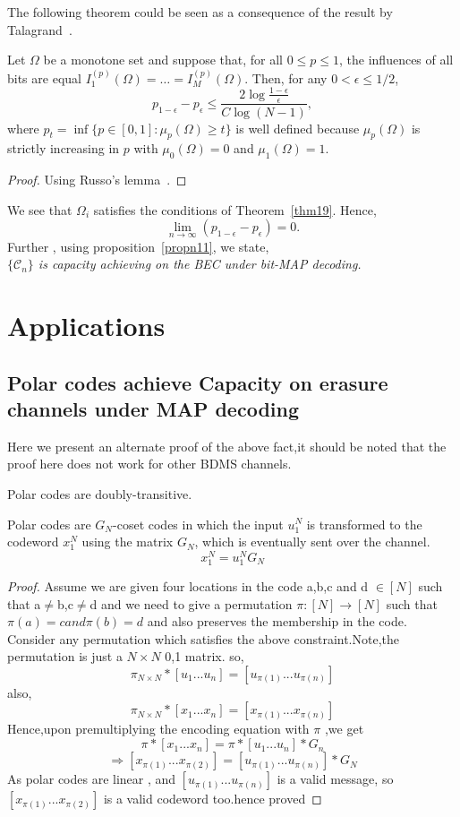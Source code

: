 \documentclass[
10pt, %
a4paper, %
oneside, %
headinclude,footinclude, %
BCOR5mm, %
]{scrartcl}
\begin{document}
The following theorem could be seen as a consequence of the result by Talagrand~\cite{talagrand}.
\begin{theorem}
Let $\Omega$ be a monotone set and suppose that, for all $0 \le p \le 1$, the influences of all bits are equal $I_1^{(p)}(\Omega) = \ldots = I_M^{(p)}(\Omega)$. Then, for any $0 < \epsilon \le 1/2$, $$p_{1-\epsilon} - p_\epsilon \le \frac{2 \log \frac{1-\epsilon}{\epsilon}}{C\log (N-1)},$$ where $p_t = \inf\{p \in [0,1] : \mu_p (\Omega) \ge t\}$ is well defined because $\mu_p(\Omega)$ is strictly increasing in $p$ with $\mu_0(\Omega) = 0$ and $\mu_1(\Omega)=1$.
\label{thm19}
\end{theorem}
\begin{proof}
Using Russo's lemma~\cite{russo}.
\end{proof}
We see that $\Omega_i$ satisfies the conditions of Theorem~\ref{thm19}.
Hence,\\$$\lim_{n \to \infty} (p_{1-\epsilon} - p_\epsilon) = 0.$$
Further , using proposition~\ref{propn11}, we state,\emph{\\$\{\mathcal{C}_n\}$ is capacity achieving on the BEC under bit-MAP decoding.}

\section{Applications}

\subsection*{Polar codes achieve Capacity on erasure channels under MAP decoding}
Here we present an alternate proof of the above fact,it should be noted that the proof here does not work for other BDMS channels.
\begin{theorem}
Polar codes are doubly-transitive.
\end{theorem} 
\label{Theorempolar}\cite{vishva}
Polar codes are $G_N$-coset codes in which the input $u_1^N$ is transformed to the codeword $x_1^N$ using the matrix $G_N$, which is eventually sent over the channel.$$x_1^N=u_1^NG_N$$
\begin{proof}
Assume we are given four locations in the code a,b,c and d $\in[N]$ such that a$\neq$b,c$\neq$d and we need to give a permutation $\pi:[N]\rightarrow[N]$ such that $\pi(a)=c and \pi(b)=d$ and also preserves the membership in the code.
Consider any permutation which satisfies the above constraint.Note,the permutation is just a $N\times N$ 0,1 matrix.
so,$$\pi_{N\times N}*[u_1 ... u_n]=[u_{\pi(1)} ... u_{\pi(n)}]$$
also,$$\pi_{N\times N}*[x_1 ... x_n]=[x_{\pi(1)} ... x_{\pi(n)}]$$
Hence,upon premultiplying the encoding equation with $\pi$ ,we get
$$\pi*[x_1 ... x_n]=\pi*[u_1 ... u_n]*G_n$$
$$\Rightarrow[x_{\pi(1)}...x_{\pi(2)}]=[u_{\pi(1)}...u_{\pi(n)}]*G_N$$
As polar codes are linear , and $[u_{\pi(1)}...u_{\pi(n)}]$ is a valid message, so $[x_{\pi(1)}...x_{\pi(2)}]$ is a valid codeword too.hence proved 
\end{proof}
\end{document}
